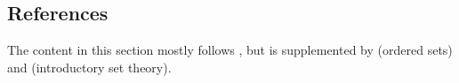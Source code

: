 \documentclass{article}
\begin{document}

\subsection{References}
The content in this section mostly follows \cite{tastetopology}, but is supplemented by \cite{marcoux2019} (ordered sets) and \cite{piotr} (introductory set theory).


\newpage

\printbibliography
\end{document}
